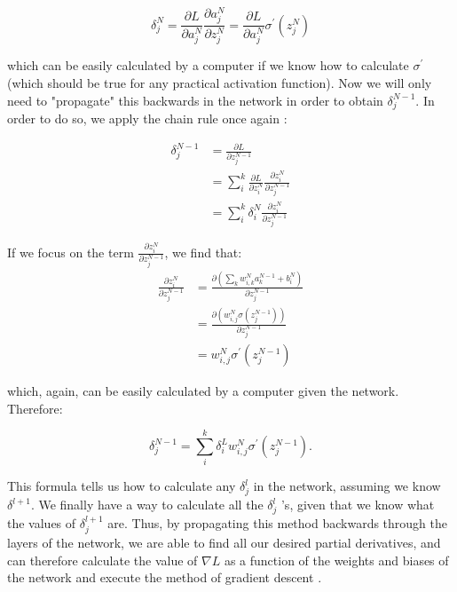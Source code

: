 \begin{equation}
  \delta^N_j = \frac{\partial L}{\partial a^N_j} \frac{\partial a^N_j}{\partial z^N_j} = \frac{\partial L}{\partial a^N_j} \sigma^{\prime}(z^N_j)
\end{equation}

which can be easily calculated by a computer if we know how to calculate $\sigma^{\prime}$ (which should be true for any practical activation function).
Now we will only need to "propagate" this backwards in the network in order to obtain $\delta^{N - 1}_j$. In order to do so, we apply the chain rule once again \cite{Guil}:

\begin{align*}
  \delta^{N - 1}_j &= \frac{\partial L}{\partial z^{N - 1}_j} \\
                   &= \sum_i^k \frac{\partial L}{\partial z^{N}_i} \frac{\partial z^N_i}{\partial z^{N - 1}_j} \\
                   &= \sum_i^k \delta^N_i \frac{\partial z^N_i}{\partial z^{N - 1}_j}
\end{align*}

If we focus on the term $\frac{\partial z^N_i}{\partial z^{N - 1}_j}$, we find that:
\begin{align*}
  \frac{\partial z^N_i}{\partial z^{N - 1}_j} & = \frac{\partial (\sum_k w^N_{i, k} a^{N - 1}_k + b^N_i)}{\partial z^{N - 1}_j} \\
                &= \frac{\partial (w^N_{i, j} \sigma (z^{N - 1}_j))}{\partial z^{N - 1}_j} \\
                &= w^N_{i, j} \sigma^{\prime} (z^{N - 1}_j)
\end{align*}

which, again, can be easily calculated by a computer given the network. Therefore:

\begin{equation}
  \delta^{N - 1}_j = \sum_i^k \delta^L_i w^N_{i, j} \sigma^{\prime} (z^{N - 1}_j).
\end{equation}

This formula tells us how to calculate any $\delta^l_j$ in the network, assuming we know $\delta^{l+1}$. We finally have a way to
calculate all the $\delta^l_j$ ’s, given that we know what the values of $\delta^{l + 1}_j$  are. Thus, by propagating this method backwards through the layers of the network, we are able to find all our desired partial derivatives, and can therefore calculate the value of $\nabla L$ as a function of the weights and biases of the network and execute the method of gradient descent \cite{Guil}.

